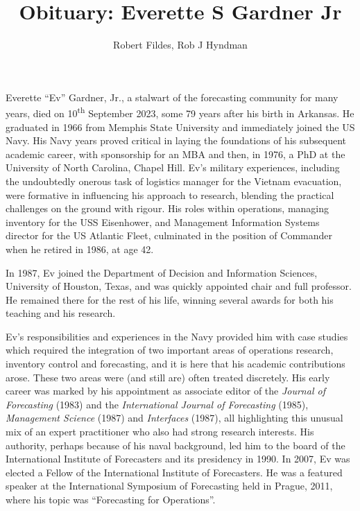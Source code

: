 \documentclass[11pt, a4paper]{article}
\begin{document}
\title{Obituary: Everette S Gardner Jr}
\author{Robert Fildes, Rob J Hyndman}
\maketitle

Everette ``Ev'' Gardner, Jr., a stalwart of the forecasting community for many years, died on 10\textsuperscript{th} September 2023, some 79 years after his birth in Arkansas. He graduated in 1966 from Memphis State University and immediately joined the US Navy. His Navy years proved critical in laying the foundations of his subsequent academic career, with sponsorship for an MBA and then, in 1976, a PhD at the University of North Carolina, Chapel Hill. Ev's military experiences, including the undoubtedly onerous task of logistics manager for the Vietnam evacuation, were formative in influencing his approach to research, blending the practical challenges on the ground with rigour. His roles within operations, managing inventory for the USS Eisenhower, and Management Information Systems director for the US Atlantic Fleet, culminated in the position of Commander when he retired in 1986, at age 42.

In 1987, Ev joined the Department of Decision and Information Sciences, University of  Houston, Texas, and was quickly appointed chair and full professor. He remained there for the rest of his life, winning several awards for both his teaching and his research.

Ev's responsibilities and experiences in the Navy provided him with case studies which required the integration of two important areas of operations research, inventory control and forecasting, and it is here that his academic contributions arose. These two areas were (and still are) often treated discretely. His early career was marked by his appointment as associate editor of the \emph{Journal of Forecasting} (1983) and the \emph{International Journal of Forecasting} (1985), \emph{Management Science} (1987) and \emph{Interfaces} (1987), all highlighting this unusual mix of an expert practitioner who also had strong research interests. His authority, perhaps because of his naval background, led him to the board of the International Institute of Forecasters and its presidency in 1990. In 2007, Ev was elected a Fellow of the International Institute of Forecasters. He was a featured speaker at the International Symposium of Forecasting held in Prague, 2011, where his topic was ``Forecasting for Operations''.
\end{document}
